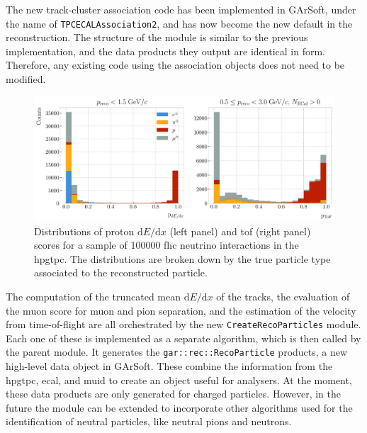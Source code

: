 The new track-cluster association code has been implemented in GArSoft, under the name of \texttt{TPCECALAssociation2}, and has now become the new default in the reconstruction. The structure of the module is similar to the previous implementation, and the data products they output are identical in form. Therefore, any existing code using the association objects does not need to be modified.

\begin{figure}[t]
    \centering
    \includegraphics[width=.99\linewidth]{Images/GArSoft_PID/caf_proton_scores.pdf}
    \caption[Distributions of proton $\mathrm{d}E/\mathrm{d}x$ and \gls{tof} scores for a sample of 100000 \gls{fhc} neutrino interactions in the \gls{hpgtpc}.]{Distributions of proton $\mathrm{d}E/\mathrm{d}x$ (left panel) and \gls{tof} (right panel) scores for a sample of 100000 \gls{fhc} neutrino interactions in the \gls{hpgtpc}. The distributions are broken down by the true particle type associated to the reconstructed particle.}
    \label{fig:proton_scores}
\end{figure}

The computation of the truncated mean $\mathrm{d}E/\mathrm{d}x$ of the tracks, the evaluation of the muon score for muon and pion separation, and the estimation of the velocity from time-of-flight are all orchestrated by the new \texttt{CreateRecoParticles} module. Each one of these is implemented as a separate algorithm, which is then called by the parent module. It generates the \texttt{gar::rec::RecoParticle} products, a new high-level data object in GArSoft. These combine the information from the \gls{hpgtpc}, \gls{ecal}, and \gls{muid} to create an object useful for analysers. At the moment, these data products are only generated for charged particles. However, in the future the module can be extended to incorporate other algorithms used for the identification of neutral particles, like neutral pions and neutrons.

